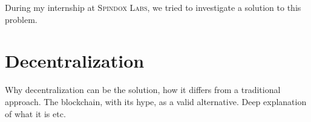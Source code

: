 During my internship at \textsc{Spindox Labs}, we tried to investigate a solution to this problem. 

\section{Decentralization}
\label{sec:decentralization}
Why decentralization can be the solution, how it differs from a traditional approach. The blockchain, with its hype, as a valid alternative. Deep explanation of what it is etc.

